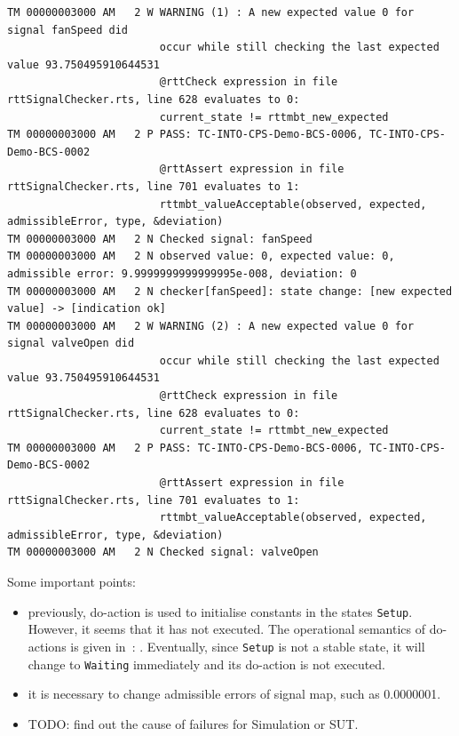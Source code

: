 \begin{lstlisting}
TM 00000003000 AM   2 W WARNING (1) : A new expected value 0 for signal fanSpeed did 
                        occur while still checking the last expected value 93.750495910644531
                        @rttCheck expression in file rttSignalChecker.rts, line 628 evaluates to 0:
                        current_state != rttmbt_new_expected
TM 00000003000 AM   2 P PASS: TC-INTO-CPS-Demo-BCS-0006, TC-INTO-CPS-Demo-BCS-0002
                        @rttAssert expression in file rttSignalChecker.rts, line 701 evaluates to 1:
                        rttmbt_valueAcceptable(observed, expected, admissibleError, type, &deviation)
TM 00000003000 AM   2 N Checked signal: fanSpeed
TM 00000003000 AM   2 N observed value: 0, expected value: 0, admissible error: 9.9999999999999995e-008, deviation: 0
TM 00000003000 AM   2 N checker[fanSpeed]: state change: [new expected value] -> [indication ok]
TM 00000003000 AM   2 W WARNING (2) : A new expected value 0 for signal valveOpen did 
                        occur while still checking the last expected value 93.750495910644531
                        @rttCheck expression in file rttSignalChecker.rts, line 628 evaluates to 0:
                        current_state != rttmbt_new_expected
TM 00000003000 AM   2 P PASS: TC-INTO-CPS-Demo-BCS-0006, TC-INTO-CPS-Demo-BCS-0002
                        @rttAssert expression in file rttSignalChecker.rts, line 701 evaluates to 1:
                        rttmbt_valueAcceptable(observed, expected, admissibleError, type, &deviation)
TM 00000003000 AM   2 N Checked signal: valveOpen
\end{lstlisting}

Some important points:
\begin{itemize}
    \item previously, do-action is used to initialise constants in the states \verb+Setup+. However, it seems that it has not executed. The operational semantics of do-actions is given in~\cite{VSI-mbt-man}: . Eventually, since \verb+Setup+ is not a stable state, it will change to \verb+Waiting+ immediately and its do-action is not executed.
    \item it is necessary to change admissible errors of signal map, such as 0.0000001.
    \item TODO: find out the cause of failures for Simulation or SUT.
\end{itemize}

